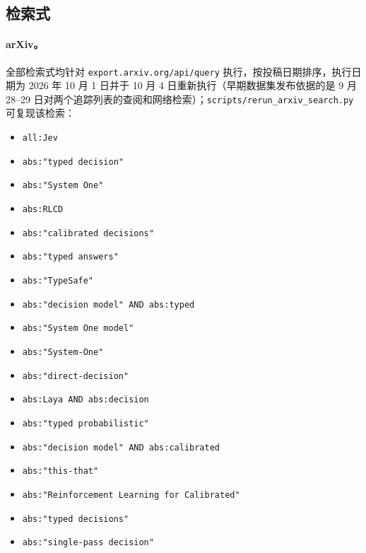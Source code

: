 \subsection{检索式}
\label{app:queries}
\paragraph{arXiv。}
全部检索式均针对 \texttt{export.arxiv.org/api/query} 执行，按投稿日期排序，执行日期为 2026 年 10 月 1 日并于 10 月 4 日重新执行（早期数据集发布依据的是 9 月 28--29 日对两个追踪列表的查阅和网络检索）；\texttt{scripts/rerun\_arxiv\_search.py} 可复现该检索：
\begin{itemize}[nosep,leftmargin=1.5em]
  \item \nolinkurl{all:Jev}
  \item \nolinkurl{abs:"typed decision"}
  \item \nolinkurl{abs:"System One"}
  \item \nolinkurl{abs:RLCD}
  \item \nolinkurl{abs:"calibrated decisions"}
  \item \nolinkurl{abs:"typed answers"}
  \item \nolinkurl{abs:"TypeSafe"}
  \item \nolinkurl{abs:"decision model" AND abs:typed}
  \item \nolinkurl{abs:"System One model"}
  \item \nolinkurl{abs:"System-One"}
  \item \nolinkurl{abs:"direct-decision"}
  \item \nolinkurl{abs:Laya AND abs:decision}
  \item \nolinkurl{abs:"typed probabilistic"}
  \item \nolinkurl{abs:"decision model" AND abs:calibrated}
  \item \nolinkurl{abs:"this-that"}
  \item \nolinkurl{abs:"Reinforcement Learning for Calibrated"}
  \item \nolinkurl{abs:"typed decisions"}
  \item \nolinkurl{abs:"single-pass decision"}
\end{itemize}

